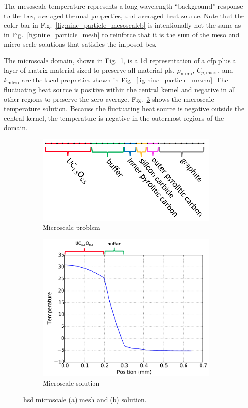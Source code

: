 The mesoscale temperature represents a long-wavelength ``background'' response to the \glspl{bc}, averaged thermal properties, and averaged heat source. Note that the color bar in Fig.\ \ref{fig:nine_particle_mesoscaleb} is intentionally not the same as in Fig.\ \ref{fig:nine_particle_mesh} to reinforce that it is the sum of the meso and micro scale solutions that satisfies the imposed \glspl{bc}.

The microscale domain, shown in Fig.\ \ref{fig:micro_a}, is a \gls{1d} representation of a \gls{cfp} plus a layer of matrix material sized to preserve all material \glspl{pf}. \(\rho_\text{micro}\), \(C_{p,\text{micro}}\), and \(k_\text{micro}\) are the local properties shown in Fig.\ \ref{fig:nine_particle_mesha}. The fluctuating heat source is positive within the central kernel and negative in all other regions to preserve the zero average. Fig.\ \ref{fig:micro_b} shows the microscale temperature solution. Because the fluctuating heat source is negative outside the central kernel, the temperature is negative in the outermost regions of the domain.

\begin{figure}[!h]
\centering
\begin{subfigure}[b]{0.49\linewidth}
\centering
\includegraphics[width=6.cm]{figs/microscale_domain_colored.png}
\vspace{2em}
\caption{Microscale problem}
\label{fig:micro_a}
\end{subfigure}
\begin{subfigure}[b]{0.49\linewidth}
\centering
\includegraphics[height=6.cm]{figs/microscale_solution.png}
\caption{Microscale solution}
\label{fig:micro_b}
\end{subfigure}
\caption{\gls{hsd} microscale (a) mesh and (b) solution.}
\end{figure}

